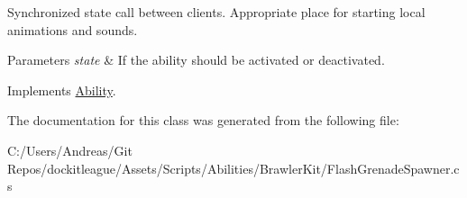 Synchronized state call between clients. Appropriate place for starting local animations and sounds. 


\begin{DoxyParams}{Parameters}
{\em state} & If the ability should be activated or deactivated.\\
\hline
\end{DoxyParams}


Implements \hyperlink{class_ability_a10f7f3c2b63eeef6e352aee48d246384}{Ability}.



The documentation for this class was generated from the following file\+:\begin{DoxyCompactItemize}
\item 
C\+:/\+Users/\+Andreas/\+Git Repos/dockitleague/\+Assets/\+Scripts/\+Abilities/\+Brawler\+Kit/Flash\+Grenade\+Spawner.\+cs\end{DoxyCompactItemize}
